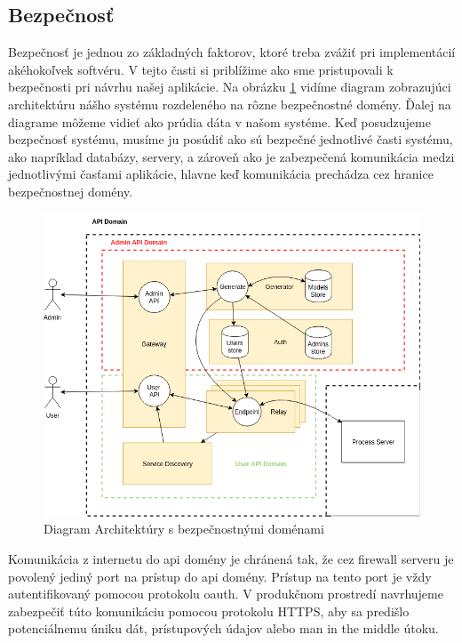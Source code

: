 \subsection{Bezpečnosť}
Bezpečnosť je jednou zo základných faktorov, ktoré treba zvážiť pri implementácií akéhokoľvek softvéru. V tejto časti si priblížime ako sme pristupovali k bezpečnosti pri návrhu našej aplikácie.  Na obrázku \ref{threat_analysis} vidíme diagram zobrazujúci architektúru nášho systému rozdeleného na rôzne bezpečnostné domény. Ďalej na diagrame môžeme vidieť ako prúdia dáta v našom systéme.  Keď posudzujeme bezpečnosť systému, musíme ju posúdiť ako sú bezpečné jednotlivé časti systému, ako napríklad databázy, servery, a zároveň ako je zabezpečená komunikácia medzi jednotlivými časťami aplikácie, hlavne keď komunikácia prechádza cez hranice bezpečnostnej domény.  

\begin{figure}[!htbp]
	\centering
	\includegraphics[width=13cm]{img/threat_analysis.png}
	\caption{Diagram Architektúry s bezpečnostnými doménami}
	\label{threat_analysis}
\end{figure}

Komunikácia z internetu do \acrshort{api} domény je chránená tak, že cez firewall serveru je povolený jediný port na prístup do \acrshort{api} domény. Prístup na tento port je vždy autentifikovaný pomocou protokolu \acrshort{oauth}. V produkčnom prostredí navrhujeme zabezpečiť túto komunikáciu pomocou protokolu HTTPS, aby sa predišlo potenciálnemu úniku dát, prístupových údajov alebo man in the middle útoku. 

